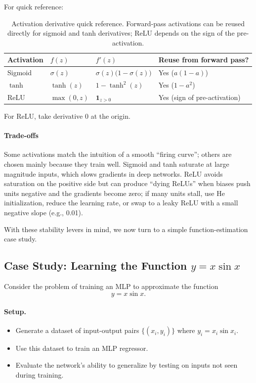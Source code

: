 For quick reference:
\begin{table}[h]
\centering
\small
\caption{Activation derivative quick reference. Forward-pass activations can be reused directly for sigmoid and tanh derivatives; ReLU depends on the sign of the pre-activation.}
\begin{tabular}{@{}llll@{}}
\toprule
Activation & \(f(z)\) & \(f'(z)\) & Reuse from forward pass? \\
\midrule
Sigmoid & \(\sigma(z)\) & \(\sigma(z)\bigl(1-\sigma(z)\bigr)\) & Yes (\(a(1-a)\)) \\
\(\tanh\) & \(\tanh(z)\) & \(1-\tanh^2(z)\) & Yes (\(1-a^2\)) \\
ReLU & \(\max(0,z)\) & \(\mathbf{1}_{z>0}\) & Yes (sign of pre-activation) \\
\bottomrule
\end{tabular}
\end{table}
For ReLU, take derivative \(0\) at the origin.

\paragraph{Trade-offs}
Some activations match the intuition of a smooth ``firing curve''; others are chosen mainly because they train well. Sigmoid and tanh saturate at large magnitude inputs, which slows gradients in deep networks. ReLU avoids saturation on the positive side but can produce ``dying ReLUs'' when biases push units negative and the gradients become zero; if many units stall, use He initialization, reduce the learning rate, or swap to a leaky ReLU with a small negative slope (e.g., 0.01).

With these stability levers in mind, we now turn to a simple function-estimation case study.

\subsection{Case Study: Learning the Function \texorpdfstring{\( y = x \sin x \)}{y = x sin x}}
\label{sec:backprop_case_study_learning_the_function_y_x_x_y_x_sin_x}

Consider the problem of training an MLP to approximate the function
\[
y = x \sin x.
\]

\paragraph{Setup.}
\begin{itemize}
    \item Generate a dataset of input-output pairs \(\{(x_i, y_i)\}\) where \(y_i = x_i \sin x_i\).
    \item Use this dataset to train an MLP regressor.
    \item Evaluate the network's ability to generalize by testing on inputs not seen during training.
\end{itemize}

